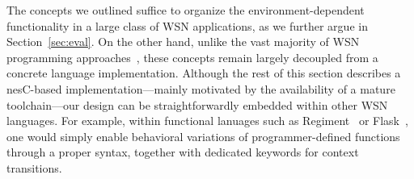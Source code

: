 The concepts we outlined suffice to organize the environment-dependent
functionality in a large class of WSN applications, as we further
argue in Section~\ref{sec:eval}. On the other hand, unlike the vast
majority of WSN programming approaches~\cite{mottola11survey}, these
concepts remain largely decoupled from a concrete language
implementation. Although the rest of this section describes a
nesC-based implementation---mainly motivated by the availability of a
mature toolchain---our design can be straightforwardly embedded within
other WSN languages. For example, within functional lanuages such as
Regiment~\cite{} or Flask~\cite{}, one would simply enable behavioral
variations of programmer-defined functions through a proper syntax,
together with dedicated keywords for context transitions.






